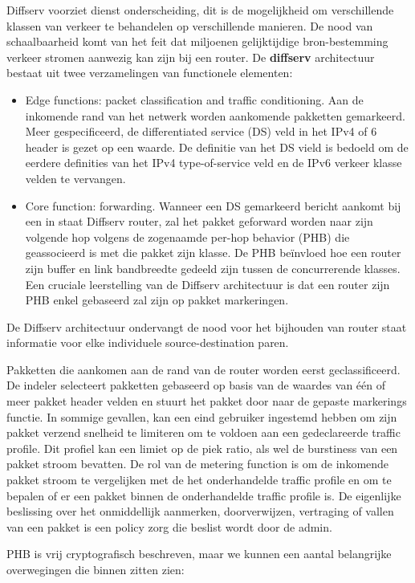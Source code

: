\noindent Diffserv voorziet dienst onderscheiding, dit is de mogelijkheid om verschillende klassen van verkeer te behandelen op verschillende manieren. De nood van schaalbaarheid komt van het feit dat miljoenen gelijktijdige bron-bestemming verkeer stromen aanwezig kan zijn bij een router.
De \textbf{diffserv} architectuur bestaat uit twee verzamelingen van functionele elementen:
\begin{itemize}
 \item	Edge functions: packet classification and traffic conditioning. Aan de inkomende rand van het netwerk worden aankomende pakketten gemarkeerd. Meer gespecificeerd, de differentiated service (DS) veld in het IPv4 of 6 header is gezet op een waarde. De definitie van het DS vield is bedoeld om de eerdere definities van het IPv4 type-of-service veld en de IPv6 verkeer klasse velden te vervangen.
\item	Core function: forwarding. Wanneer een DS gemarkeerd bericht aankomt bij een in staat Diffserv router, zal het pakket geforward worden naar zijn volgende hop volgens de zogenaamde per-hop behavior (PHB) die geassocieerd is met die pakket zijn klasse. De PHB beïnvloed hoe een router zijn buffer en link bandbreedte gedeeld zijn tussen de concurrerende klasses. Een cruciale leerstelling van de Diffserv architectuur is dat een router zijn PHB enkel gebaseerd zal zijn op pakket markeringen.
\end{itemize}
De Diffserv architectuur ondervangt de nood voor het bijhouden van router staat informatie voor elke individuele source-destination paren.

\noindent Pakketten die aankomen aan de rand van de router worden eerst geclassificeerd. De indeler selecteert pakketten gebaseerd op basis van de waardes van één of meer pakket header velden en stuurt het pakket door naar de gepaste markerings functie. In sommige gevallen, kan een eind gebruiker ingestemd hebben om zijn pakket verzend snelheid te limiteren om te voldoen aan een gedeclareerde traffic profile. Dit profiel kan een limiet op de piek ratio, als wel de burstiness van een pakket stroom bevatten. De rol van de metering function is om de inkomende pakket stroom te vergelijken met de het onderhandelde traffic profile en om te bepalen of er een pakket binnen de onderhandelde traffic profile is. De eigenlijke beslissing over het onmiddellijk aanmerken, doorverwijzen, vertraging of vallen van een pakket is een policy zorg die beslist wordt door de admin.

\noindent PHB is vrij cryptografisch beschreven, maar we kunnen een aantal belangrijke overwegingen die binnen zitten zien:

